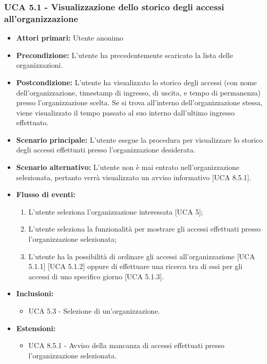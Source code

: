 \subsubsection{UCA 5.1 - Visualizzazione dello storico degli accessi all'organizzazione}
\begin{itemize}
    \item \textbf{Attori primari:} Utente anonimo
    \item \textbf{Precondizione:} L'utente ha precedentemente scaricato la lista delle organizzazioni.
    \item \textbf{Postcondizione:} L'utente ha visualizzato lo storico degli accessi (con nome dell'organizzazione, timestamp di ingresso, di uscita, e tempo di permanenza) presso l'organizzazione scelta. Se si trova all'interno dell'organizzazione stessa, viene visualizzato il tempo passato al suo interno dall'ultimo ingresso effettuato.
    \item \textbf{Scenario principale:} L'utente esegue la procedura per visualizzare lo storico degli accessi effettuati presso l'organizzazione desiderata.
    \item \textbf{Scenario alternativo:} L'utente non è mai entrato nell'organizzazione selezionata, pertanto verrà visualizzato un avviso informativo [UCA 8.5.1].
    \item \textbf{Flusso di eventi:}
    \begin{enumerate}
        \item L'utente seleziona l'organizzazione interessata [UCA 5];
        \item L'utente seleziona la funzionalità per mostrare gli accessi effettuati presso l'organizzazione selezionata;
        \item L'utente ha la possibilità di ordinare gli accessi all'organizzazione [UCA 5.1.1] [UCA 5.1.2] oppure di effettuare una ricerca tra di essi per gli accessi di uno specifico giorno [UCA 5.1.3].
    \end{enumerate}
    \item \textbf{Inclusioni:}
    \begin{itemize}
        \item UCA 5.3 - Selezione di un'organizzazione.
    \end{itemize}
    \item \textbf{Estensioni:}
    \begin{itemize}
        \item UCA 8.5.1 - Avviso della mancanza di accessi effettuati presso l'organizzazione selezionata.
    \end{itemize}
\end{itemize}

